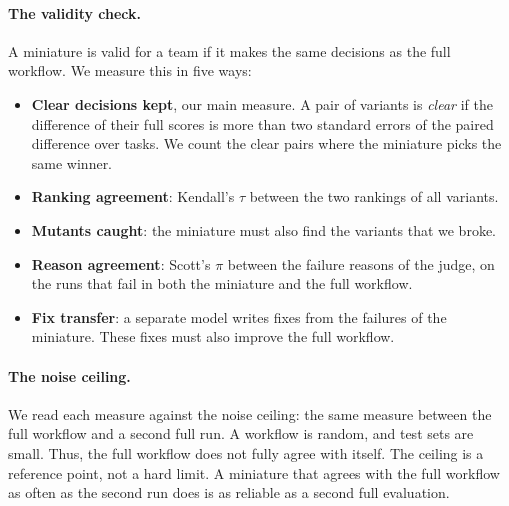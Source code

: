 \paragraph{The validity check.}
A miniature is valid for a team if it makes the same decisions as the full workflow. We measure
this in five ways:
\begin{itemize}
  \item \textbf{Clear decisions kept}, our main measure. A pair of variants is \emph{clear} if the
  difference of their full scores is more than two standard errors of the paired difference over
  tasks. We count the clear pairs where the miniature picks the same winner.
  \item \textbf{Ranking agreement}: Kendall's $\tau$ between the two rankings of all variants.
  \item \textbf{Mutants caught}: the miniature must also find the variants that we broke.
  \item \textbf{Reason agreement}: Scott's $\pi$ between the failure reasons of the judge, on the
  runs that fail in both the miniature and the full workflow.
  \item \textbf{Fix transfer}: a separate model writes fixes from the failures of the miniature.
  These fixes must also improve the full workflow.
\end{itemize}

\paragraph{The noise ceiling.}
We read each measure against the noise ceiling: the same measure between the full workflow and a
second full run. A workflow is random, and test sets are small. Thus, the full workflow does not
fully agree with itself. The ceiling is a reference point, not a hard limit. A miniature that
agrees with the full workflow as often as the second run does is as reliable as a second full
evaluation.
